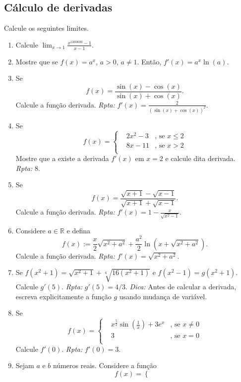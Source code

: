 \documentclass[latin,20pt]{article}
\begin{document}
    \subsection{Cálculo de derivadas}   
   Calcule os seguintes limites.  
    \begin{enumerate}
    \item Calcule $\lim_{x \rightarrow 1} \frac{x^{1000000}-1}{x-1}$.	
    \item Mostre que se $f(x)=a^{x}$, $a>0$, $a \neq 1$. 
    Então, $f'(x)=a^{x}\ln(a)$.
    \item Se $$f(x)=\frac{\sin(x)-\cos(x)}{\sin(x)+\cos(x)}.$$ 
    Calcule a função derivada. {\it Rpta: }
    $f'(x)=\frac{2}{\left(\sin(x)+\cos(x)\right)^{2}}$. 
    \item  Se $$
    f(x)= \left\{  
    \begin{array}{lll}
    &2x^2-3 &\text{, se } x \leq 2 \\
    &8x-11     &\text{, se } x > 2 \\
    \end{array}
    \right. $$
    Mostre que a existe a derivada $f'(x)$ em $x=2$ e calcule dita derivada. 
    {\it Rpta:} 8.
    \item Se $$f(x)=\frac{\sqrt{x+1}-\sqrt{x-1}}{\sqrt{x+1}+\sqrt{x-1}}.$$ 
    Calcule a função derivada. {\it Rpta: }
    $f'(x)=1-\frac{x}{\sqrt{x^{2}-1}}$. 
    \item Considere $a \in \mathbb{R}$ e defina  $$f(x):=\frac{x}{2}\sqrt{x^{2}+a^{2}}+
            \frac{a^2}{2}\ln \left( x+ \sqrt{x^{2}+a^{2}}\right).$$ 
    Calcule a função derivada. {\it Rpta: }
    $f'(x)=\sqrt{x^2+a^{2}}$. 
    \item Se $f(x^{2}+1)=\sqrt{x^{2}+1}+\sqrt[6]{16(x^{2}+1)}$
    e $f(x^{2}-1)=g(x^{2}+1)$. Calcule $g'(5)$. {\it Rpta:}
     $g'(5)=4/3$. {\it Dica:} Antes de calcular a derivada, escreva 
     explicitamente a função $g$ usando mudança de variável. 
    \item  Se $$
    f(x)= \left\{  
    \begin{array}{lll}
    &x^{\frac{5}{2}}\sin(\frac{1}{x})+3e^{x} &\text{, se } x \neq 0 \\
    &3     &\text{, se } x=0 \\
    \end{array}
    \right. $$
    Calcule $f'(0)$. {\it Rpta: } $f'(0)=3$.
     \item Sejam $a$ e $b$ números reais. Considere a função 
    $$
    f(x)= \left\{  
    \begin{array}{lll}

\end{array}$$
\end{enumerate}
\end{document}
